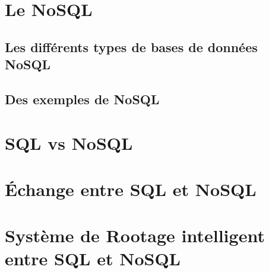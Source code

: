 \section{Le \textsf{NoSQL}}


\subsection{Les différents types de bases de données \textsf{NoSQL}} 
 

\subsection{Des exemples de \textsf{NoSQL}}


\section{\textsf{SQL} vs \textsf{NoSQL}}


\section{Échange entre \textsf{SQL} et \textsf{NoSQL}}


\section{Système de Rootage intelligent entre \textsf{SQL} et \textsf{NoSQL}}

